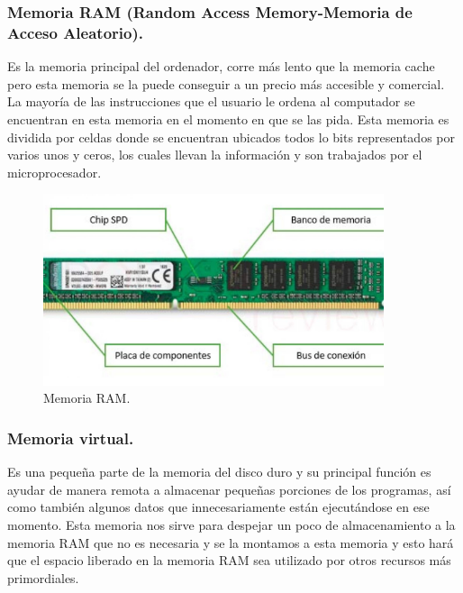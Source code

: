 \documentclass{article}
\begin{document}
\paragraph{}

\subsubsection{Memoria RAM (Random Access Memory-Memoria de Acceso Aleatorio).}


Es la memoria principal del ordenador, corre más lento que la memoria cache pero esta memoria se la puede conseguir a un precio más accesible y comercial. La mayoría de las instrucciones que el usuario le ordena al computador se encuentran en esta memoria en el momento en que se las pida. Esta memoria es dividida por celdas donde se encuentran ubicados todos lo bits representados por varios unos y ceros, los cuales llevan la información y son trabajados por el microprocesador.

\begin{figure}[h]
\includegraphics[width=10cm]{imagen3.jpg}
\centering
\caption{Memoria RAM. \cite{img3}}
\label{fig:imagen3}
\end{figure}
\paragraph{}
\subsubsection{Memoria virtual.}

Es una pequeña parte de la memoria del disco duro y su principal función es ayudar de manera remota a almacenar pequeñas porciones de los programas, así como también algunos datos que innecesariamente están ejecutándose en ese momento. Esta memoria nos sirve para despejar un poco de almacenamiento a la memoria RAM que no es necesaria y se la montamos a esta memoria y esto hará que el espacio liberado en la memoria RAM sea utilizado por otros recursos más primordiales.
\end{document}

